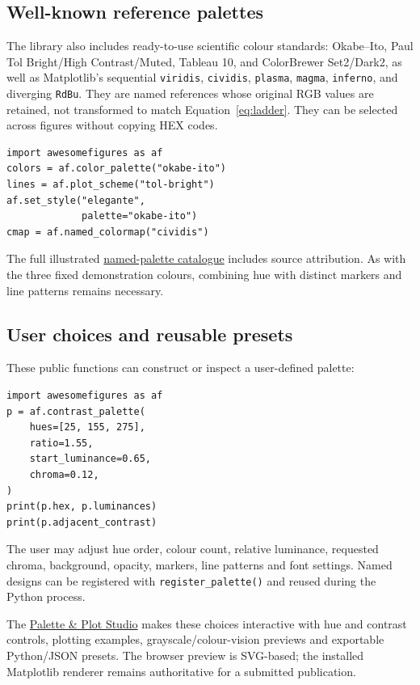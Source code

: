 \documentclass[10pt,twocolumn,a4paper]{article}
\begin{document}
\subsection{Well-known reference palettes}
The library also includes ready-to-use scientific colour standards:
Okabe--Ito, Paul Tol Bright/High Contrast/Muted, Tableau 10,
and ColorBrewer Set2/Dark2, as well as Matplotlib's sequential
\texttt{viridis}, \texttt{cividis}, \texttt{plasma},
\texttt{magma}, \texttt{inferno}, and diverging \texttt{RdBu}.
They are named references whose original RGB values are retained,
not transformed to match Equation~\ref{eq:ladder}.
They can be selected across figures without copying HEX codes.

\begin{verbatim}
import awesomefigures as af
colors = af.color_palette("okabe-ito")
lines = af.plot_scheme("tol-bright")
af.set_style("elegante",
             palette="okabe-ito")
cmap = af.named_colormap("cividis")
\end{verbatim}
The full illustrated \href{https://heri-espino.github.io/Colors/named_palettes.html}
{named-palette catalogue} includes source attribution.
As with the three fixed demonstration colours, combining
hue with distinct markers and line patterns remains necessary.

\subsection{User choices and reusable presets}
These public functions can construct or inspect a
user-defined palette:
\begin{verbatim}
import awesomefigures as af
p = af.contrast_palette(
    hues=[25, 155, 275],
    ratio=1.55,
    start_luminance=0.65,
    chroma=0.12,
)
print(p.hex, p.luminances)
print(p.adjacent_contrast)
\end{verbatim}
The user may adjust hue order, colour count,
relative luminance, requested chroma, background,
opacity, markers, line patterns and font settings.
Named designs can be registered with
\texttt{register\_palette()} and reused during the
Python process.

The \href{https://heri-espino.github.io/Colors/studio.html}
{Palette \& Plot Studio} makes these choices interactive
with hue and contrast controls, plotting examples,
grayscale/colour-vision previews and exportable
Python/JSON presets. The browser preview is SVG-based;
the installed Matplotlib renderer remains authoritative
for a submitted publication.
\end{document}
